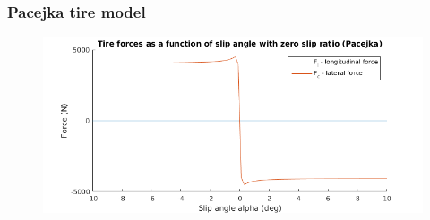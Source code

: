 \documentclass{beamer}
\begin{document}
\begin{frame}
\frametitle{Pacejka tire model}

\begin{figure} [h]
\begin{center}
\includegraphics[scale=0.55]{images/pacejka_graph.png}
\label{fig:pacejka}
\end{center}
\end{figure}

\end{frame}
\end{document}
